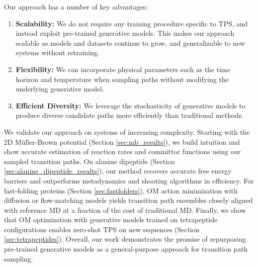 Our approach has a number of key advantages:
\vspace{-5pt}
\begin{enumerate}
    \itemsep-1pt
    \item \textbf{Scalability:} We do not require any training procedure specific to TPS, and instead exploit pre-trained generative models. This makes our approach scalable as models and datasets continue to grow, and generalizable to new systems without retraining. 
    \item \textbf{Flexibility:} We can incorporate physical parameters such as the time horizon and temperature when sampling paths without modifying the underlying generative model.
    \item \textbf{Efficient Diversity:} We leverage the stochasticity of generative models to produce diverse candidate paths more efficiently than traditional methods.
\end{enumerate}
\vspace{-7 pt}
We validate our approach on systems of increasing complexity. Starting with the 2D Müller-Brown potential (Section \ref{sec:mb_results}), we build intuition and show accurate estimation of reaction rates and committor functions using our sampled transition paths. On alanine dipeptide (Section \ref{sec:alanine_dipeptide_results}), our method recovers accurate free energy barriers and outperforms metadynamics and shooting algorithms in efficiency. For fast-folding proteins (Section \ref{sec:fastfolders}), OM action minimization with diffusion or flow-matching models yields transition path ensembles closely aligned with reference MD at a fraction of the cost of traditional MD. Finally, we show that OM optimization with generative models trained on tetrapeptide configurations enables zero-shot TPS on new sequences (Section \ref{sec:tetrapeptides}). Overall, our work demonstrates the promise of repurposing pre-trained generative models as a general-purpose approach for transition path sampling.






